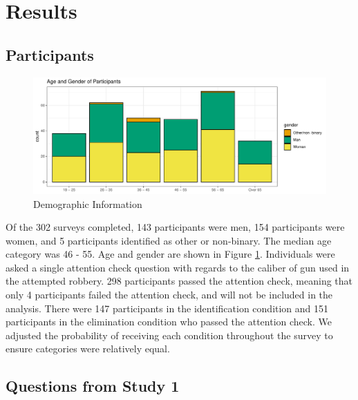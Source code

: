 \documentclass[print]{nuthesis}
\begin{document}
\hypertarget{results-1}{%
\section{Results}\label{results-1}}

\hypertarget{participants-1}{%
\subsection{Participants}\label{participants-1}}

\begin{figure}

{\centering \includegraphics[width=\linewidth]{thesis_files/figure-latex/demographics2-1} 

}

\caption{Demographic Information}\label{fig:demographics2}
\end{figure}

Of the 302 surveys completed, 143 participants were men, 154 participants were women, and 5 participants identified as other or non-binary.
The median age category was 46 - 55.
Age and gender are shown in Figure \ref{fig:demographics2}.
Individuals were asked a single attention check question with regards to the caliber of gun used in the attempted robbery.
298 participants passed the attention check, meaning that only 4 participants failed the attention check, and will not be included in the analysis.
There were 147 participants in the identification condition and 151 participants in the elimination condition who passed the attention check.
We adjusted the probability of receiving each condition throughout the survey to ensure categories were relatively equal.

\hypertarget{questions-from-study-1}{%
\subsection{Questions from Study 1}\label{questions-from-study-1}}
\end{document}
